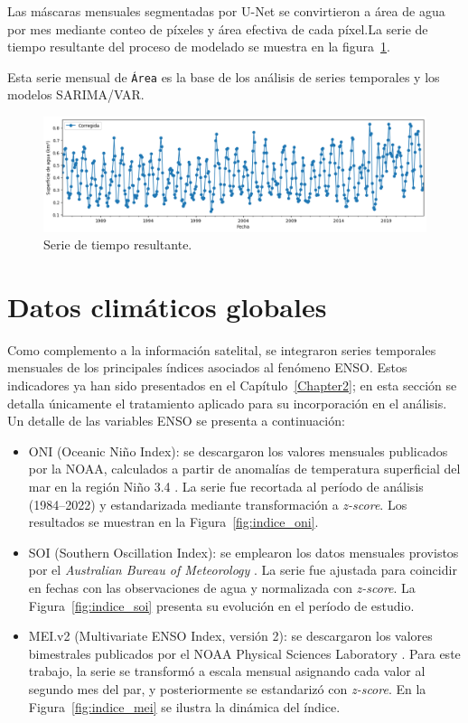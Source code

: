 Las máscaras mensuales segmentadas por U-Net se convirtieron a área de agua por mes mediante conteo de píxeles y área efectiva de cada píxel.La serie de tiempo resultante del proceso de modelado se muestra en la figura~\ref{fig:ts_cnn}.

Esta serie mensual de \texttt{Área} es la base de los análisis de series temporales y los modelos SARIMA/VAR.

\begin{figure}[ht]
        \centering
        \includegraphics[scale=.45]
        {Figures/ts_final_cnn.png}
        \caption{Serie de tiempo resultante.}
        \label{fig:ts_cnn}
\end{figure}


\section{Datos climáticos globales}

Como complemento a la información satelital, se integraron series temporales mensuales de los principales índices asociados al fenómeno ENSO. Estos indicadores ya han sido presentados en el Capítulo~\ref{Chapter2}; en esta sección se detalla únicamente el tratamiento aplicado para su incorporación en el análisis. Un detalle de las variables ENSO se presenta a continuación:

\begin{itemize}
    \item ONI (Oceanic Niño Index): se descargaron los valores mensuales publicados por la NOAA, calculados a partir de anomalías de temperatura superficial del mar en la región Niño 3.4 \parencite{noaaONI}. La serie fue recortada al período de análisis (1984--2022) y estandarizada mediante transformación a \textit{z-score}. Los resultados se muestran en la Figura~\ref{fig:indice_oni}.
    
    \item SOI (Southern Oscillation Index): se emplearon los datos mensuales provistos por el \textit{Australian Bureau of Meteorology} \parencite{bom_soi_2024}. La serie fue ajustada para coincidir en fechas con las observaciones de agua y normalizada con \textit{z-score}. La Figura~\ref{fig:indice_soi} presenta su evolución en el período de estudio.
    
    \item MEI.v2 (Multivariate ENSO Index, versión 2): se descargaron los valores bimestrales publicados por el NOAA Physical Sciences Laboratory \parencite{meiindex}. Para este trabajo, la serie se transformó a escala mensual asignando cada valor al segundo mes del par, y posteriormente se estandarizó con \textit{z-score}. En la Figura~\ref{fig:indice_mei} se ilustra la dinámica del índice.
\end{itemize}

